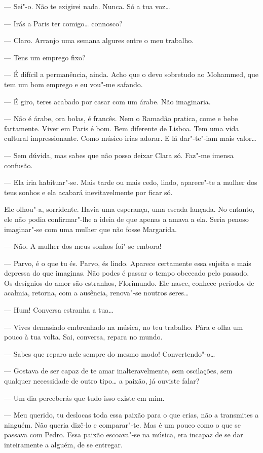 --- Sei"-o. Não te exigirei nada. Nunca. Só a tua voz\ldots{}

--- Irás a Paris ter comigo\ldots{} connosco?

--- Claro. Arranjo uma semana algures entre o meu trabalho.

--- Tens um emprego fixo?

--- É difícil a permanência, ainda. Acho que o devo sobretudo ao Mohammed,
que tem um bom emprego e eu vou"-me safando.

--- É giro, teres acabado por casar com um árabe. Não imaginaria.

--- Não é árabe, ora bolas, é francês. Nem o Ramadão pratica, come e bebe
fartamente. Viver em Paris é bom. Bem diferente de Lisboa. Tem uma vida
cultural impressionante. Como músico irias adorar. E lá dar"-te"-iam mais
valor\ldots{}

--- Sem dúvida, mas sabes que não posso deixar Clara só. Faz"-me imensa
confusão.

--- Ela iria habituar"-se. Mais tarde ou mais cedo, lindo, aparece"-te a
mulher dos teus sonhos e ela acabará inevitavelmente por ficar só.

Ele olhou"-a, sorridente. Havia uma esperança, uma escada lançada. No
entanto, ele não podia confirmar"-lhe a ideia de que apenas a amava a
ela. Seria penoso imaginar"-se com uma mulher que não fosse Margarida.

--- Não. A mulher dos meus sonhos foi"-se embora!

--- Parvo, é o que tu és. Parvo, és lindo. Aparece certamente essa sujeita
e mais depressa do que imaginas. Não podes é passar o tempo obcecado
pelo passado. Os desígnios do amor são estranhos, Florimundo. Ele nasce,
conhece períodos de acalmia, retorna, com a ausência, renova"-se noutros
seres\ldots{}

--- Hum! Conversa estranha a tua\ldots{}

--- Vives demasiado embrenhado na música, no teu trabalho. Pára e olha um
pouco à tua volta. Sai, conversa, repara no mundo.

--- Sabes que reparo nele sempre do mesmo modo! Convertendo"-o\ldots{}

--- Gostava de ser capaz de te amar inalteravelmente, sem oscilações, sem
qualquer necessidade de outro tipo\ldots{} a paixão, já ouviste falar?

--- Um dia perceberás que tudo isso existe em mim.

--- Meu querido, tu deslocas toda essa paixão para o que crias, não a
transmites a ninguém. Não queria dizê-lo e comparar"-te. Mas é um pouco
como o que se passava com Pedro. Essa paixão escoava"-se na música, era
incapaz de se dar inteiramente a alguém, de se entregar.

